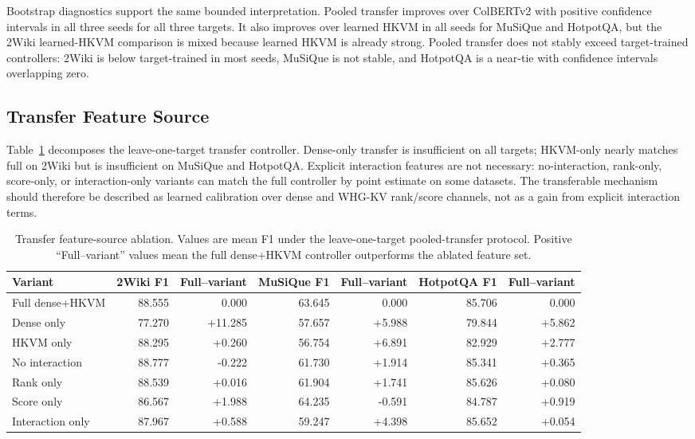 \documentclass[conference]{IEEEtran}
\begin{document}
Bootstrap diagnostics support the same bounded interpretation. Pooled transfer improves over ColBERTv2 with positive confidence intervals in all three seeds for all three targets. It also improves over learned HKVM in all seeds for MuSiQue and HotpotQA, but the 2Wiki learned-HKVM comparison is mixed because learned HKVM is already strong. Pooled transfer does not stably exceed target-trained controllers: 2Wiki is below target-trained in most seeds, MuSiQue is not stable, and HotpotQA is a near-tie with confidence intervals overlapping zero.

\subsection{Transfer Feature Source}

Table~\ref{tab:supp_p1_feature_transfer} decomposes the leave-one-target transfer controller. Dense-only transfer is insufficient on all targets; HKVM-only nearly matches full on 2Wiki but is insufficient on MuSiQue and HotpotQA. Explicit interaction features are not necessary: no-interaction, rank-only, score-only, or interaction-only variants can match the full controller by point estimate on some datasets. The transferable mechanism should therefore be described as learned calibration over dense and WHG-KV rank/score channels, not as a gain from explicit interaction terms.

\begin{table}[t]
\caption{Transfer feature-source ablation. Values are mean F1 under the leave-one-target pooled-transfer protocol. Positive ``Full--variant'' values mean the full dense+HKVM controller outperforms the ablated feature set.}
\label{tab:supp_p1_feature_transfer}
\centering
\small
\setlength{\tabcolsep}{4pt}
\begin{tabular}{lrrrrrr}
\toprule
Variant & 2Wiki F1 & Full--variant & MuSiQue F1 & Full--variant & HotpotQA F1 & Full--variant \\
\midrule
Full dense+HKVM & 88.555 & 0.000 & 63.645 & 0.000 & 85.706 & 0.000 \\
Dense only & 77.270 & +11.285 & 57.657 & +5.988 & 79.844 & +5.862 \\
HKVM only & 88.295 & +0.260 & 56.754 & +6.891 & 82.929 & +2.777 \\
No interaction & 88.777 & -0.222 & 61.730 & +1.914 & 85.341 & +0.365 \\
Rank only & 88.539 & +0.016 & 61.904 & +1.741 & 85.626 & +0.080 \\
Score only & 86.567 & +1.988 & 64.235 & -0.591 & 84.787 & +0.919 \\
Interaction only & 87.967 & +0.588 & 59.247 & +4.398 & 85.652 & +0.054 \\
\bottomrule
\end{tabular}
\end{table}
\end{document}
